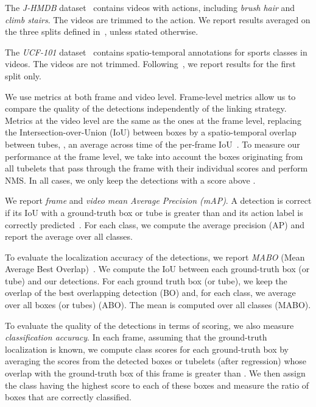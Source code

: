 \documentclass[10pt,twocolumn,letterpaper]{article}
\begin{document}
The \textit{J-HMDB} dataset~\cite{jhmdb} contains  videos with  actions, including \textit{brush hair} and \textit{climb stairs}. The videos are trimmed to the action. 
We report results averaged on the three splits defined in~\cite{jhmdb}, unless stated otherwise.  

The \textit{UCF-101} dataset~\cite{ucf101} contains spatio-temporal annotations for  sports classes in  videos. The videos are not trimmed. 
Following~\cite{Gkioxari15cvpr,Peng16eccv,Suman16bmvc,Weinzaepfel15iccv}, we report results for the first split only. 

We use metrics at both frame and video level. 
Frame-level metrics allow us to compare the quality of the detections independently of the linking strategy. 
Metrics at the video level are the same as the ones at the frame level, replacing the Intersection-over-Union (IoU) between boxes by a spatio-temporal overlap between tubes, \ie, an average across time of the per-frame IoU~\cite{Suman16bmvc,Weinzaepfel15iccv}. 
To measure our performance at the frame level, we take into account the boxes originating from all tubelets that pass through the frame with their individual scores and perform NMS. 
In all cases, we only keep the detections with a score above . 

We report \textit{frame} and \textit{video mean Average Precision (mAP)}. A detection is correct if its IoU with a ground-truth box or tube is greater than  and its action label is correctly predicted~\cite{pascal07:thomas}. For each class, we compute the average precision (AP) and report the average over all classes.

To evaluate the localization accuracy of the detections, we report \textit{MABO} (Mean Average Best Overlap)~\cite{uijlings13ijcv}. We compute the IoU between each ground-truth box (or tube) and our detections. For each ground truth box (or tube), we keep the overlap of the best overlapping detection (BO) and, for each class, we average over all boxes (or tubes) (ABO). The mean is computed over all classes (MABO).  

To evaluate the quality of the detections in terms of scoring, we also measure \textit{classification accuracy}. In each frame, assuming that the ground-truth localization is known, we compute class scores for each ground-truth box by averaging the scores from the detected boxes or tubelets (after regression) whose overlap with the ground-truth box of this frame is greater than . We then assign the class having the highest score to each of these boxes and measure the ratio of boxes that are correctly classified.
\end{document}
